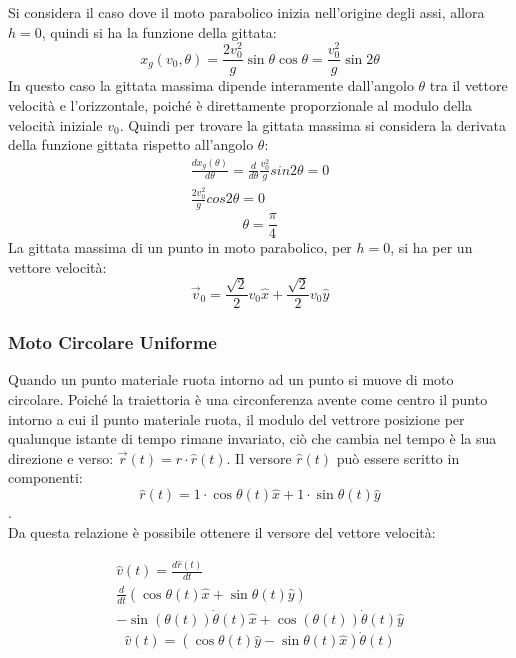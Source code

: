\documentclass{article}
\numberwithin{equation}{subsection}
\begin{document}
Si considera il caso dove il moto parabolico inizia nell'origine 
degli assi, allora $h=0$, quindi si ha la funzione della gittata:
\begin{equation}
    x_g(v_0,\theta)=\displaystyle\frac{2v_0^2}{g}\sin\theta \cos\theta=\frac{v_0^2}{g}\sin2\theta
\end{equation}
In questo caso la gittata massima dipende interamente dall'angolo 
$\theta$ tra il vettore velocità e l'orizzontale, poiché è direttamente proporzionale al modulo della velocità iniziale $v_0$. Quindi
per trovare la gittata massima si considera la derivata della funzione gittata rispetto all'angolo $\theta$: 
\begin{gather*}
    \displaystyle\frac{dx_g(\theta)}{d\theta}=\frac{d}{d\theta}\frac{v_0^2}{g}sin2\theta=0\\
    \displaystyle\frac{2v_0^2}{g}cos2\theta=0
\end{gather*}
\begin{equation}
    \theta=\displaystyle\frac{\pi}{4}
\end{equation}
La gittata massima di un punto in moto parabolico, per $h=0$, 
si ha per un vettore velocità:
\begin{equation} 
    \vec{v}_0=\displaystyle\frac{\sqrt{2}}{2}v_0\hat{x}+\frac{\sqrt{2}}{2}v_0\hat{y}
\end{equation}

\subsubsection{Moto Circolare Uniforme}

Quando un punto materiale ruota intorno ad un punto si muove di moto circolare.
Poiché la traiettoria è una circonferenza avente come centro il 
punto intorno a cui il punto materiale ruota, il modulo del vettrore posizione 
per qualunque istante di tempo rimane invariato, ciò che cambia nel tempo è 
la sua direzione e verso: $\vec{r}(t)=r\cdot\hat{r}(t)$.
Il versore $\hat{r}(t)$ può essere scritto in componenti: 
\begin{equation}
    \hat{r}(t)=1\cdot \cos\theta(t)\hat{x}+1\cdot \sin\theta(t)\hat{y}
\end{equation}.\\
Da questa relazione è possibile ottenere il versore del 
vettore velocità: 

\begin{gather*}
    \hat{v}(t)=\displaystyle\frac{d\hat{r}(t)}{dt}\\
    \displaystyle\frac{d}{dt}\left(\cos\theta(t)\hat{x}+\sin\theta(t)\hat{y}\right)\\
    -\sin(\theta(t))\dot\theta(t)\hat{x}+\cos(\theta(t))\dot\theta(t)\hat{y}
\end{gather*}
\begin{equation}
    \hat{v}(t)=\left(\cos\theta(t)\hat{y}-\sin\theta(t)\hat{x}\right)\dot\theta(t)
\end{equation}
\end{document}
